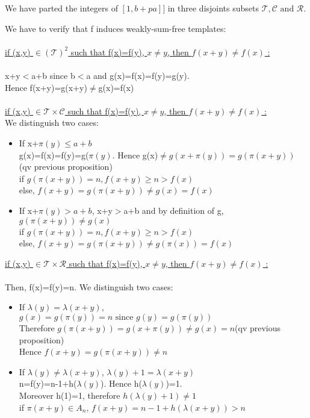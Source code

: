 We have parted the integers of \(\![1,b+pa]\!]\) in three disjoints subsets \(\mathcal{T},\mathcal{C} \text{ and } \mathcal{R}\).

We have to verify that f induces weakly-sum-free templates:\\
\\
\underline{if (x,y) \(\in (\mathcal{T})^2\) such that f(x)=f(y), \(x \neq y\), then \(f(x+y)\neq f(x)\)  :}\\
\\x+y\(<\)a+b since b\(<\)a and g(x)=f(x)=f(y)=g(y).
\\Hence f(x+y)=g(x+y)\(\neq\)g(x)=f(x)
\\\\
\underline{if (x,y) \(\in \mathcal{T} \times \mathcal{C}\) such that f(x)=f(y), \(x \neq y\), then \(f(x+y)\neq f(x)\)  :}\\
We distinguish two cases:


\begin{itemize}
\item If x+\(\pi(y)\leqslant a+b\)
\\g(x)=f(x)=f(y)=g(\(\pi(y)\). Hence g(x)\(\neq g(x+\pi(y))=g(\pi(x+y))\) (qv previous proposition)
\\if \(g(\pi(x+y))=n, f(x+y)\geqslant n > f(x)\)
\\else, \(f(x+y)=g(\pi(x+y))\neq g(x)=f(x)\)
\item If x+\(\pi(y)> a+b\), x+y\(>\)a+b and by definition of g, \(g(\pi(x+y))\neq g(x)\)
\\if \(g(\pi(x+y))=n, f(x+y)\geqslant n > f(x)\)
\\else, \(f(x+y)=g(\pi(x+y))\neq g(\pi(x))=f(x)\)
\end{itemize}


\underline{if (x,y) \(\in \mathcal{T} \times \mathcal{R}\) such that f(x)=f(y), \(x \neq y\), then \(f(x+y)\neq f(x)\)  :}\\
\\Then, f(x)=f(y)=n. We distinguish two cases:


\begin{itemize}
\item If \(\lambda(y)=\lambda(x+y)\),
\\\(g(x)=g(\pi(y))=n \text{ since } g(y)=g(\pi(y))\)
\\Therefore \(g(\pi(x+y))=g(x+\pi(y)) \neq g(x)=n\)(qv previous proposition)
\\Hence \(f(x+y)=g(\pi(x+y))\neq n\)
\item If  \(\lambda(y)\neq \lambda(x+y)\), \(\lambda(y)+1= \lambda(x+y)\)\\
n=f(y)=n-1+h(\(\lambda(y)\)). Hence h(\(\lambda(y)\))=1.
\\Moreover h(1)=1, therefore \(h(\lambda(y)+1) \neq 1\)
\\if \(\pi(x+y) \in A_n\), \(f(x+y)=n-1+h(\lambda(x+y))>n\)
\end{itemize}

